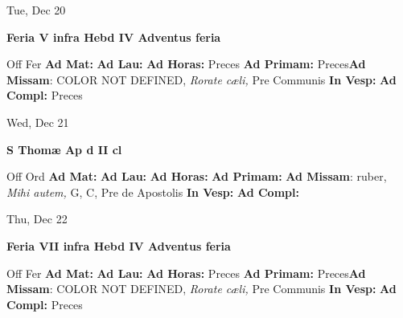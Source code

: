 \documentclass[10pt]{memoir}
\begin{document}
\begin{center}
\begin{minipage}{3.5in}
\vspace{2em}
\begin{center}Tue, Dec 20
\end{center}
\textbf{ \large Feria V infra Hebd IV Adventus
\textnormal{\normalsize feria}}

\begin{justify}Off Fer
\textbf{Ad Mat: }
\textbf{Ad Lau: }
\textbf{Ad Horas: }Preces
\textbf{Ad Primam: }Preces\textbf{Ad Missam}: COLOR NOT DEFINED, \textit{Rorate cæli,} Pre Communis
\textbf{In Vesp: }
\textbf{Ad Compl: }Preces
\end{justify}
\end{minipage}
\end{center}

\begin{center}
\begin{minipage}{3.5in}
\vspace{2em}
\begin{center}Wed, Dec 21
\end{center}
\textbf{ \large S Thomæ Ap
\textnormal{\normalsize d II cl}}

\begin{justify}Off Ord
\textbf{Ad Mat: }
\textbf{Ad Lau: }
\textbf{Ad Horas: }
\textbf{Ad Primam: }\textbf{Ad Missam}: ruber, \textit{Mihi autem,} G, C, Pre de Apostolis
\textbf{In Vesp: }
\textbf{Ad Compl: }
\end{justify}
\end{minipage}
\end{center}

\begin{center}
\begin{minipage}{3.5in}
\vspace{2em}
\begin{center}Thu, Dec 22
\end{center}
\textbf{ \large Feria VII infra Hebd IV Adventus
\textnormal{\normalsize feria}}

\begin{justify}Off Fer
\textbf{Ad Mat: }
\textbf{Ad Lau: }
\textbf{Ad Horas: }Preces
\textbf{Ad Primam: }Preces\textbf{Ad Missam}: COLOR NOT DEFINED, \textit{Rorate cæli,} Pre Communis
\textbf{In Vesp: }
\textbf{Ad Compl: }Preces
\end{justify}
\end{minipage}
\end{center}
\end{document}
